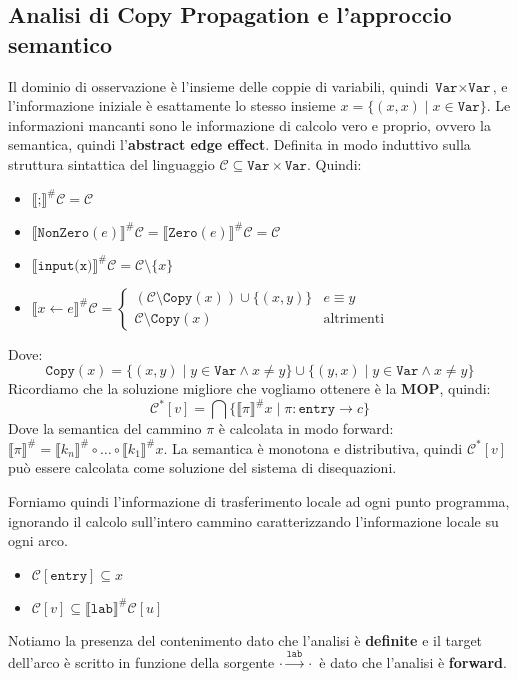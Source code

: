 \subsection{Analisi di Copy Propagation e l'approccio semantico}
Il dominio di osservazione è l'insieme delle coppie di variabili,
quindi $\texttt{Var} \times \texttt{Var}$, e l'informazione iniziale è esattamente lo stesso insieme
$x =\{(x,x) \mid x \in \texttt{Var}\}$.
Le informazioni mancanti sono le informazione di calcolo vero e proprio, ovvero la semantica, quindi 
l'\textbf{abstract edge effect}. Definita in modo induttivo sulla struttura sintattica del linguaggio 
$\mathcal{C} \subseteq \texttt{Var} \times \texttt{Var}$.
Quindi:
\begin{itemize}
    \item $\llbracket\texttt{;} \rrbracket^\# \mathcal{C} = \mathcal{C}$
    \item $\llbracket \texttt{NonZero}(e) \rrbracket^\# \mathcal{C} = 
    \llbracket \texttt{Zero}(e) \rrbracket^\# \mathcal{C}
    = \mathcal{C}$
    \item $\llbracket \texttt{input(x)} \rrbracket^\# \mathcal{C} =
    \mathcal{C} \setminus \{x\}$
    \item $\llbracket x \gets e \rrbracket^\# \mathcal{C} = 
    \begin{cases}
        (\mathcal{C} \setminus \texttt{Copy}(x)) \cup \{(x,y)\} & e \equiv y \\
        \mathcal{C} \setminus \texttt{Copy}(x) & \text{altrimenti}
    \end{cases}
    $
\end{itemize}
Dove:
\[
  \texttt{Copy}(x) = \{(x,y) \mid y \in \texttt{Var} \land x \not = y\} 
  \cup \{(y,x) \mid y \in \texttt{Var} \land x \not = y\}
\]
Ricordiamo che la soluzione migliore che vogliamo ottenere è la \textbf{MOP}, quindi:
\[
    \mathcal{C}^* [v] = \bigcap  \{\llbracket \pi \rrbracket^\# x \mid \pi : \texttt{entry} \rightarrow c \}
\]
Dove la semantica del cammino $\pi$ è calcolata in modo forward: $\llbracket \pi \rrbracket^\# =
\llbracket k_n \rrbracket^\# \circ \dots \circ \llbracket k_1 \rrbracket^\# x$.
La semantica è monotona e distributiva, quindi $\mathcal{C}^* [v]$ può essere calcolata come 
soluzione del sistema di disequazioni.

Forniamo quindi l'informazione di trasferimento locale ad ogni punto programma, ignorando il calcolo 
sull'intero cammino caratterizzando l'informazione locale su ogni arco.

\begin{itemize}
    \item $\mathcal{C}[\texttt{entry}] \subseteq x$ 
    \item $\mathcal{C}[v] \subseteq \llbracket \texttt{lab}\rrbracket^\# \mathcal{C}[u]$
\end{itemize}
Notiamo la presenza del contenimento dato che l'analisi è \textbf{definite} e il target 
dell'arco è scritto in funzione della sorgente $\cdot \stackrel{\texttt{lab}}{\longrightarrow} \cdot$ è dato 
che l'analisi è \textbf{forward}.

